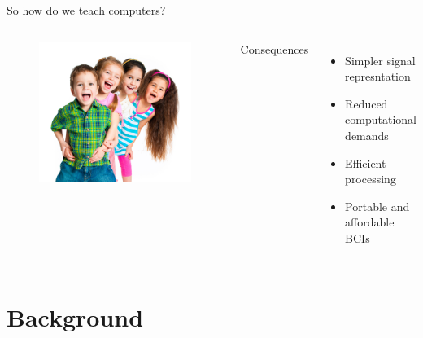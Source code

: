 \documentclass[12pt]{beamer}
\begin{document}
\begin{frame}{\sc So how do we teach computers?}

\begin{columns}

\column{2.4in}
\begin{figure}
\includegraphics[scale=0.3]{figures/kids}
\end{figure}


\column{2in}
{\sc Consequences}
\begin{itemize}
\item Simpler signal represntation 
\item Reduced computational demands
\item Efficient processing 
\item Portable and affordable BCIs
\end{itemize}

\end{columns}

\end{frame}


\section{\sc Background}
\end{document}
